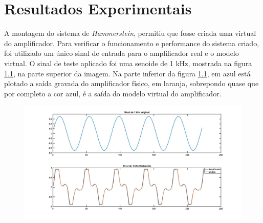\chapter{Resultados Experimentais}




A montagem do sistema de \textit{Hammerstein}, permitiu que fosse criada uma virtual do amplificador. Para verificar o funcionamento e performance do sistema criado, foi utilizado um único sinal de entrada para o amplificador real e o modelo virtual. O sinal de teste aplicado foi uma senoide de 1 kHz, mostrada na figura \ref{fig:tccfig}, na parte superior da imagem. Na parte inferior da figura \ref{fig:tccfig}, em azul está plotado a saída gravada do amplificador físico, em laranja, sobrepondo quase que por completo a cor azul, é a saída do modelo virtual do amplificador.

\begin{figure}
	\centering
	\includegraphics[width=1\linewidth]{figuras/TCC_fig}
	\caption{}
	\label{fig:tccfig}
\end{figure}

